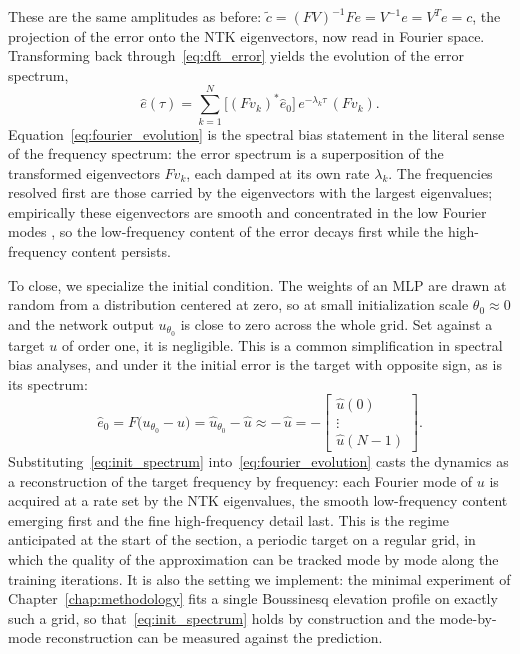These are the same amplitudes as before: $\tilde c = (FV)^{-1}F e = V^{-1} e = V^T e = c$, the projection of the error onto the NTK eigenvectors, now read in Fourier space. Transforming back through~\eqref{eq:dft_error} yields the evolution of the error spectrum,
\begin{equation}\label{eq:fourier_evolution}
    \hat e(\tau) = \sum_{k=1}^{N} \bigl[(F v_k)^{*}\hat e_0\bigr]\, e^{-\lambda_k\tau}\,(F v_k).
\end{equation}
Equation~\eqref{eq:fourier_evolution} is the spectral bias statement in the literal sense of the frequency spectrum: the error spectrum is a superposition of the transformed eigenvectors $F v_k$, each damped at its own rate $\lambda_k$. The frequencies resolved first are those carried by the eigenvectors with the largest eigenvalues; empirically these eigenvectors are smooth and concentrated in the low Fourier modes \parencite{rahaman2019, xu2019frequency}, so the low-frequency content of the error decays first while the high-frequency content persists.

To close, we specialize the initial condition. The weights of an MLP are drawn at random from a distribution centered at zero, so at small initialization scale $\theta_0 \approx 0$ and the network output $u_{\theta_0}$ is close to zero across the whole grid. Set against a target $u$ of order one, it is negligible. This is a common simplification in spectral bias analyses, and under it the initial error is the target with opposite sign, as is its spectrum:
\begin{equation}\label{eq:init_spectrum}
    \hat e_0 = F\bigl(u_{\theta_0} - u\bigr) = \hat u_{\theta_0} - \hat u
    \approx -\,\hat u
    = -\begin{bmatrix} \hat u(0) \\ \vdots \\ \hat u(N-1) \end{bmatrix}.
\end{equation}
Substituting~\eqref{eq:init_spectrum} into~\eqref{eq:fourier_evolution} casts the dynamics as a reconstruction of the target frequency by frequency: each Fourier mode of $u$ is acquired at a rate set by the NTK eigenvalues, the smooth low-frequency content emerging first and the fine high-frequency detail last. This is the regime anticipated at the start of the section, a periodic target on a regular grid, in which the quality of the approximation can be tracked mode by mode along the training iterations. It is also the setting we implement: the minimal experiment of Chapter~\ref{chap:methodology} fits a single Boussinesq elevation profile on exactly such a grid, so that~\eqref{eq:init_spectrum} holds by construction and the mode-by-mode reconstruction can be measured against the prediction.

